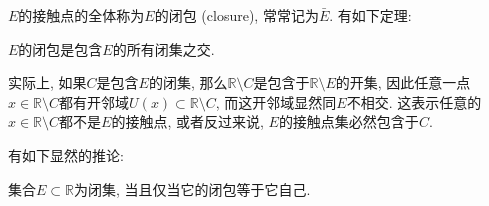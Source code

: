 $E$的接触点的全体称为$E$的闭包 (closure), 常常记为$\bar E$. 有如下定理:
\begin{theorem}{}
$E$的闭包是包含$E$的所有闭集之交.
\end{theorem}
实际上, 如果$C$是包含$E$的闭集, 那么$\mathbb{R}\setminus C$是包含于$\mathbb{R}\setminus E$的开集, 因此任意一点$x\in\mathbb{R}\setminus C$都有开邻域$U(x)\subset\mathbb{R}\setminus C$, 而这开邻域显然同$E$不相交. 这表示任意的$x\in\mathbb{R}\setminus C$都不是$E$的接触点, 或者反过来说, $E$的接触点集必然包含于$C$. 

有如下显然的推论:
\begin{corollary}{}
集合$E\subset\mathbb{R}$为闭集, 当且仅当它的闭包等于它自己.
\end{corollary}